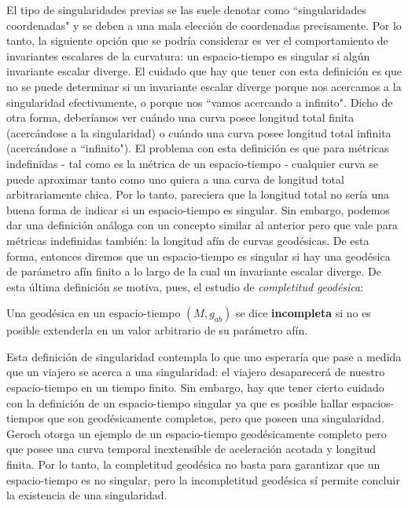 El tipo de singularidades previas se las suele denotar como ``singularidades coordenadas" y se deben a una mala elección de coordenadas precisamente. Por lo tanto, la siguiente opción que se podría considerar es ver el comportamiento de invariantes escalares de la curvatura: un espacio-tiempo es singular si algún invariante escalar diverge. El cuidado que hay que tener con esta definición es que no se puede determinar si un invariante escalar diverge porque nos acercamos a la singularidad efectivamente, o porque nos ``vamos acercando a infinito". Dicho de otra forma, deberíamos ver cuándo una curva posee longitud total finita (acercándose a la singularidad) o cuándo una curva posee longitud total infinita (acercándose a ``infinito"). El problema con esta definición es que para métricas indefinidas - tal como es la métrica de un espacio-tiempo - cualquier curva se puede aproximar tanto como uno quiera a una curva de longitud total arbitrariamente chica. Por lo tanto, pareciera que la longitud total no sería una buena forma de indicar si un espacio-tiempo es singular. Sin embargo, podemos dar una definición análoga con un concepto similar al anterior pero que vale para métricas indefinidas también: la longitud afín de curvas geodésicas. De esta forma, entonces diremos que un espacio-tiempo es singular si hay una geodésica de parámetro afín finito a lo largo de la cual un invariante escalar diverge. De esta última definición se motiva, pues, el estudio de \textit{completitud geodésica}:

\begin{definition}
Una geodésica en un espacio-tiempo $(M,g_{ab})$ se dice \textbf{incompleta} si no es posible extenderla en un valor arbitrario de su parámetro afín.
\end{definition}


Esta definición de singularidad contempla lo que uno esperaría que pase a medida que un viajero se acerca a una singularidad: el viajero desaparecerá de nuestro espacio-tiempo en un tiempo finito. Sin embargo, hay que tener cierto cuidado con la definición de un espacio-tiempo singular ya que es posible hallar espacios-tiempos que son geodésicamente completos, pero que poseen una singularidad. Geroch \citep{1968AnPhy..48..526G} otorga un ejemplo de un espacio-tiempo geodésicamente completo pero que posee una curva temporal inextensible de aceleración acotada y longitud finita. Por lo tanto, la completitud geodésica no basta para garantizar que un espacio-tiempo es no singular, pero la incompletitud geodésica sí permite concluir la existencia de una singularidad.

